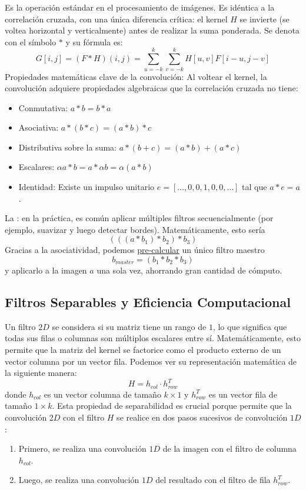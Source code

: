 \noindent
Es la operación estándar en el procesamiento de imágenes. Es idéntica a la correlación cruzada, con una única diferencia crítica: el kernel $H$ se invierte (se voltea horizontal y verticalmente) antes de realizar la suma ponderada. Se denota con el símbolo $\ast$ y su fórmula es:
\begin{equation*}
    G[i,j]= (F\ast H)(i,j)=\sum_{u=-k}^{k} \sum_{v=-k}^{k} H[u,v]F[i-u,j-v]
\end{equation*}
\noindent
Propiedades matemáticas clave de la convolución: Al voltear el kernel, la convolución adquiere propiedades algebraicas que la correlación cruzada no tiene:
\begin{itemize}
    \item Conmutativa: $a\ast b=b\ast a$
    \item Asociativa: $a\ast(b\ast c)=(a\ast b)\ast c$
    \item Distributiva sobre la suma: $a\ast(b+c)=(a\ast b)+(a\ast c)$
    \item Escalares: $\alpha a\ast b=a\ast \alpha b=\alpha(a\ast b)$
    \item Identidad: Existe un impulso unitario $e=[…,0,0,1,0,0,…]$ tal que $a\ast e=a$.
\end{itemize}
\noindent
La : en la práctica, es común aplicar múltiples filtros secuencialmente (por ejemplo, suavizar y luego detectar bordes). Matemáticamente, esto sería 
$$(((a\ast b_1)\ast b_2)\ast b_3)$$
Gracias a la asociatividad, podemos \underline{pre-calcular} un único filtro maestro 
$$b_{master}=(b_1\ast b_2\ast b_3)$$
y aplicarlo a la imagen $a$ una sola vez, ahorrando gran cantidad de cómputo.


\subsection{Filtros Separables y Eficiencia Computacional}

\begin{definicion}
    Un filtro $2D$ se considera  si su matriz tiene un rango de $1$, lo que significa que todas sus filas o columnas son múltiplos escalares entre sí. Matemáticamente, esto permite que la matriz del kernel se factorice como el producto externo de un vector columna por un vector fila. Podemos ver su representación matemática de la siguiente manera:
    $$H = h_{col} \cdot h_{row}^T$$
    donde $h_{col}$ es un vector columna de tamaño $k \times 1$ y $h_{row}^T$ es un vector fila de tamaño $1 \times k$. Esta propiedad de separabilidad es crucial porque permite que la convolución $2D$ con el filtro $H$ se realice en dos pasos sucesivos de convolución $1D$:
    \begin{enumerate}
        \item Primero, se realiza una convolución $1D$ de la imagen con el filtro de columna $h_{col}$.
        \item Luego, se realiza una convolución $1D$ del resultado con el filtro de fila $h_{row}^T$. \\
    \end{enumerate}
\end{definicion}

